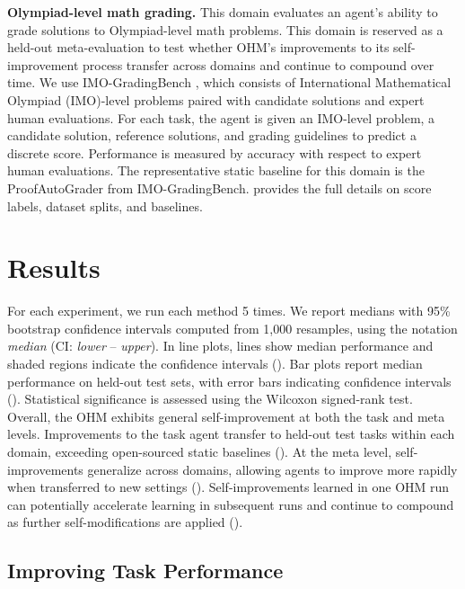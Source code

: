 \documentclass[]{fairmeta}
\begin{document}
\textbf{Olympiad-level math grading.}
This domain evaluates an agent's ability to grade solutions to Olympiad-level math problems. This domain is reserved as a held-out meta-evaluation to test whether OHM's improvements to its self-improvement process transfer across domains and continue to compound over time. We use IMO-GradingBench \citep{luong2025towards}, which consists of International Mathematical Olympiad (IMO)-level problems paired with candidate solutions and expert human evaluations. For each task, the agent is given an IMO-level problem, a candidate solution, reference solutions, and grading guidelines to predict a discrete score. Performance is measured by accuracy with respect to expert human evaluations. The representative static baseline for this domain is the ProofAutoGrader from IMO-GradingBench.  provides the full details on score labels, dataset splits, and baselines.

\section{Results}
\label{sec:results}

For each experiment, we run each method 5 times. We report medians with 95\% bootstrap confidence intervals computed from 1,000 resamples, using the notation \textit{median} (CI: \textit{lower} -- \textit{upper}). In line plots, lines show median performance and shaded regions indicate the confidence intervals (). Bar plots report median performance on held-out test sets, with error bars indicating confidence intervals (). Statistical significance is assessed using the Wilcoxon signed-rank test. Overall, the OHM exhibits general self-improvement at both the task and meta levels. Improvements to the task agent transfer to held-out test tasks within each domain, exceeding open-sourced static baselines (). At the meta level, self-improvements generalize across domains, allowing agents to improve more rapidly when transferred to new settings (). Self-improvements learned in one OHM run can potentially accelerate learning in subsequent runs and continue to compound as further self-modifications are applied ().

\subsection{Improving Task Performance}
\label{sec:results-task}
\end{document}
